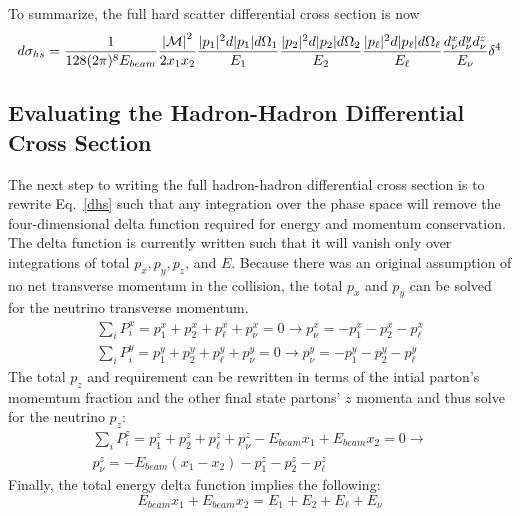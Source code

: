 \noindent To summarize, the full hard scatter differential cross
section is now
\begin{equation}
\label{dhs}
d\sigma_{hs} = \frac{1}{128(2\pi)^{8}E_{beam}}
\frac{{|\cal M|}^{2}}{2x_{1}x_{2}}
\frac{|p_{1}|^{2}d|p_{1}|d\Omega_{1}}{E_{1}}
\frac{|p_{2}|^{2}d|p_{2}|d\Omega_{2}}{E_{2}}
\frac{|p_{\ell}|^{2}d|p_{\ell}|d\Omega_{\ell}}{E_{\ell}}
\frac{d^{x}_{\nu} d^{y}_{\nu} d^{z}_{\nu}}{E_{\nu}} \delta^{4} 
\end{equation} 


\subsection{Evaluating the Hadron-Hadron Differential Cross Section}

The next step to writing the full hadron-hadron differential cross
section is to rewrite Eq.~\ref{dhs} such that any integration over the
phase space will remove the four-dimensional delta function required
for energy and momentum conservation. The delta function is currently
written such that it will vanish only over integrations of total
$p_{x}, p_{y}, p_{z}$, and $E$. Because there was an original
assumption of no net transverse momentum in the collision, the total
$p_{x}$ and $p_{y}$ can be solved for the neutrino transverse
momentum.
\begin{eqnarray}
\sum_{i}P^{x}_{i} =
p^{x}_{1} + p^{x}_{2} + p^{x}_{\ell} + p^{x}_{\nu} = 0
\rightarrow p^{x}_{\nu} =
- p^{x}_{1} - p^{x}_{2} - p^{x}_{\ell} \\
\sum_{i}P^{y}_{i} =
p^{y}_{1} + p^{y}_{2} + p^{y}_{\ell} + p^{y}_{\nu} = 0
\rightarrow p^{y}_{\nu} =
- p^{y}_{1} - p^{y}_{2} - p^{y}_{\ell}
\end{eqnarray}
\noindent The total $p_{z}$ and requirement can be rewritten in terms
of the intial parton's momemtum fraction and the other final state
partons' $z$ momenta and thus solve for the neutrino $p_{z}$:
\begin{eqnarray}
\nonumber
\sum_{i}P^{z}_{i} =
p^{z}_{1} + p^{z}_{2} + p^{z}_{\ell} + p^{z}_{\nu} -
E_{beam}x_{1} + E_{beam}x_{2} = 0 \rightarrow \\
p^{z}_{\nu} =
- E_{beam}(x_{1} - x_{2}) - p^{z}_{1} - p^{z}_{2} - p^{z}_{\ell}
\end{eqnarray}
\noindent Finally, the total energy delta function implies the
following:
\begin{equation}
E_{beam}x_{1} + E_{beam}x_{2} = E_{1} + E_{2} + E_{\ell} + E_{\nu}
\end{equation}

